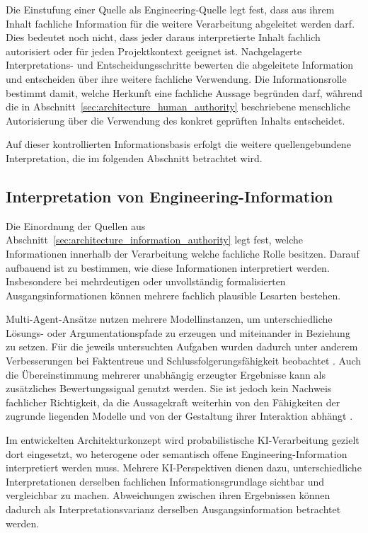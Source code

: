 Die Einstufung einer Quelle als Engineering-Quelle legt fest, dass aus ihrem
Inhalt fachliche Information für die weitere Verarbeitung abgeleitet werden
darf. Dies bedeutet noch nicht, dass jeder daraus interpretierte Inhalt
fachlich autorisiert oder für jeden Projektkontext geeignet ist.
Nachgelagerte Interpretations- und Entscheidungsschritte bewerten die
abgeleitete Information und entscheiden über ihre weitere fachliche
Verwendung. Die Informationsrolle bestimmt damit, welche Herkunft eine
fachliche Aussage begründen darf, während die in
Abschnitt~\ref{sec:architecture_human_authority} beschriebene menschliche
Autorisierung über die Verwendung des konkret geprüften Inhalts entscheidet.

Auf dieser kontrollierten Informationsbasis erfolgt die weitere
quellengebundene Interpretation, die im folgenden Abschnitt betrachtet wird.

\subsection{Interpretation von Engineering-Information}
\label{sec:architecture_grounded_interpretation}

Die Einordnung der Quellen aus
Abschnitt~\ref{sec:architecture_information_authority} legt fest, welche
Informationen innerhalb der Verarbeitung welche fachliche Rolle besitzen.
Darauf aufbauend ist zu bestimmen, wie diese Informationen interpretiert
werden. Insbesondere bei mehrdeutigen oder unvollständig formalisierten
Ausgangsinformationen können mehrere fachlich plausible Lesarten bestehen.

Multi-Agent-Ansätze nutzen mehrere Modellinstanzen, um unterschiedliche
Lösungs- oder Argumentationspfade zu erzeugen und miteinander in Beziehung
zu setzen. Für die jeweils untersuchten Aufgaben wurden dadurch unter anderem
Verbesserungen bei Faktentreue und Schlussfolgerungsfähigkeit beobachtet
\cite{Du2024}. Auch die Übereinstimmung mehrerer unabhängig erzeugter
Ergebnisse kann als zusätzliches Bewertungssignal genutzt werden. Sie ist
jedoch kein Nachweis fachlicher Richtigkeit, da die Aussagekraft weiterhin
von den Fähigkeiten der zugrunde liegenden Modelle und von der Gestaltung
ihrer Interaktion abhängt
\cite{Du2024,TriemDing2024,Sunkaraneni2026}.

Im entwickelten Architekturkonzept wird probabilistische KI-Verarbeitung
gezielt dort eingesetzt, wo heterogene oder semantisch offene
Engineering-Information interpretiert werden muss. Mehrere
KI-Perspektiven dienen dazu, unterschiedliche Interpretationen derselben
fachlichen Informationsgrundlage sichtbar und vergleichbar zu machen.
Abweichungen zwischen ihren Ergebnissen können dadurch als
Interpretationsvarianz derselben Ausgangsinformation betrachtet werden.

